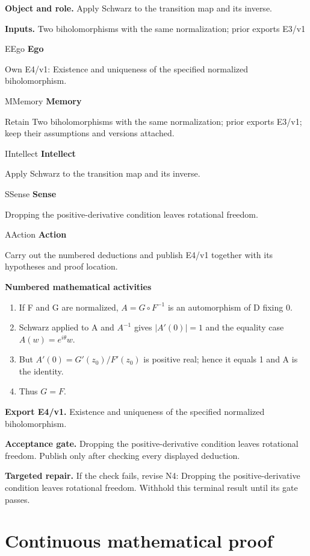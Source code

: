 \documentclass[preprint,12pt,aps,pra,showkeys,amsmath,amssymb,superscriptaddress,floatfix]{revtex4-2}
\theoremstyle{definition}
\theoremstyle{remark}
\newcommand{\mmfaculty}[3]{%
 \begin{mmfacultybox}{#1}{#2}
 {\sffamily\bfseries\color{MMBlue}#2}\par\smallskip #3
 \end{mmfacultybox}}
\newcommand{\field}[2]{\par\smallskip\noindent\textbf{#1.} #2\par}
\begin{document}
\field{Object and role}{Apply Schwarz to the transition map and its inverse.}

\field{Inputs}{Two biholomorphisms with the same normalization; prior exports E3/v1}

\mmfaculty{E}{Ego}{Own E4/v1: Existence and uniqueness of the specified normalized
biholomorphism.}

\mmfaculty{M}{Memory}{Retain Two biholomorphisms with the same normalization; prior exports
E3/v1; keep their assumptions and versions attached.}

\mmfaculty{I}{Intellect}{Apply Schwarz to the transition map and its inverse.}

\mmfaculty{S}{Sense}{Dropping the positive-derivative condition leaves rotational freedom.}

\mmfaculty{A}{Action}{Carry out the numbered deductions and publish E4/v1 together with its
hypotheses and proof location.}

\smallskip\noindent\textbf{Numbered mathematical activities}

\begin{enumerate}[label=N4.\arabic*,leftmargin=3.4em]

\item If F and G are normalized, \(A=G\circ F^{-1}\) is an automorphism of D
fixing 0.

\item Schwarz applied to A and \(A^{-1}\) gives \(|A'(0)|=1\) and the equality
case \(A(w)=e^{i\theta }w\).

\item But \(A'(0)=G'(z_{0})/F'(z_{0})\) is positive real; hence it equals 1
and A is the identity.

\item Thus \(G=F\).

\end{enumerate}

\field{Export E4/v1}{Existence and uniqueness of the specified normalized biholomorphism.}

\field{Acceptance gate}{Dropping the positive-derivative condition leaves rotational freedom.
Publish only after checking every displayed deduction.}

\field{Targeted repair}{If the check fails, revise N4: Dropping the positive-derivative
condition leaves rotational freedom. Withhold this terminal result until
its gate passes.}

\endgroup\clearpage\section{Continuous mathematical proof}\label{sec:proof}
\end{document}

